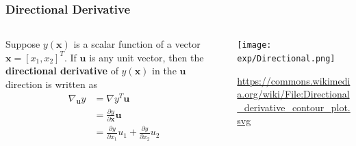 \documentclass{beamer}
\begin{document}
\begin{frame}
  \frametitle{Directional Derivative}
  \begin{columns}
    \begin{column}{0.5\textwidth}
      Suppose $y(\mathbf{x})$ is a scalar function of a vector
      $\mathbf{x}=[x_1,x_2]^T$.  If $\mathbf{u}$ is any unit vector,
      then the {\bf directional derivative} of $y(\mathbf{x})$ in the
      $\mathbf{u}$ direction is written as
      \begin{align*}
        \nabla_{\mathbf{u}}y &=
        \nabla y^T \mathbf{u}\\
        &= \frac{\partial y}{\partial\mathbf{x}}\mathbf{u}\\
        &=
        \frac{\partial y}{\partial x_1}u_1+\frac{\partial y}{\partial x_2}u_2
      \end{align*}
    \end{column}
    \begin{column}{0.5\textwidth}
      \centerline{\texttt{[image: exp/Directional.png]}}
      \url{https://commons.wikimedia.org/wiki/File:Directional_derivative_contour_plot.svg}
    \end{column}
  \end{columns}
\end{frame}
\end{document}
